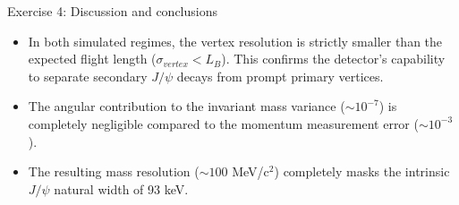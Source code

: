 \begin{frame}{Exercise 4: Discussion and conclusions}
    \begin{itemize}
        \item In both simulated regimes, the vertex resolution is strictly smaller than the expected flight length ($\sigma_{vertex} < L_B$). This confirms the detector's capability to separate secondary $J/\psi$ decays from prompt primary vertices.
        \item The angular contribution to the invariant mass variance ($\sim 10^{-7}$) is completely negligible compared to the momentum measurement error ($\sim 10^{-3}$).
        \item The resulting mass resolution ($\sim 100$ MeV/c$^2$) completely masks the intrinsic $J/\psi$ natural width of 93 keV. 
    \end{itemize}
\end{frame}
